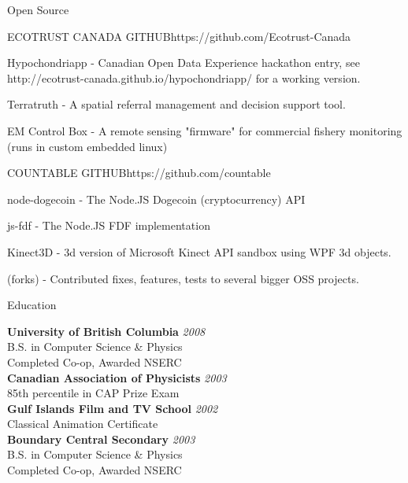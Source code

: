 \documentclass{resume} %
\begin{document}
\begin{rSection}{Open Source}

\begin{rSubsection}{ECOTRUST CANADA GITHUB}{https://github.com/Ecotrust-Canada}{}{}
\item Hypochondriapp - Canadian Open Data Experience hackathon entry, see \newline
http://ecotrust-canada.github.io/hypochondriapp/ for a working version.
\item Terratruth - A spatial referral management and decision support tool.
\item EM Control Box - A remote sensing "firmware" for commercial fishery monitoring (runs in custom embedded linux)
\end{rSubsection}

\begin{rSubsection}{COUNTABLE GITHUB}{https://github.com/countable}{}{}
\item node-dogecoin - The Node.JS Dogecoin (cryptocurrency) API
\item js-fdf - The Node.JS FDF implementation
\item Kinect3D - 3d version of Microsoft Kinect API sandbox using WPF 3d objects.
\item (forks) - Contributed fixes, features, tests to several bigger OSS projects.
\end{rSubsection}


\end{rSection}




\begin{rSection}{Education}

{\bf University of British Columbia} \hfill {\em 2008} \\ 
B.S. in Computer Science \& Physics \\
Completed Co-op, Awarded NSERC \\

{\bf Canadian Association of Physicists} \hfill {\em 2003} \\ 
85th percentile in CAP Prize Exam \\

{\bf Gulf Islands Film and TV School} \hfill {\em 2002} \\ 
Classical Animation Certificate \\

{\bf Boundary Central Secondary} \hfill {\em 2003} \\ 
B.S. in Computer Science \& Physics \\
Completed Co-op, Awarded NSERC \\

\end{rSection}
\end{document}
